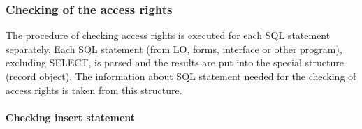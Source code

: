 \subsubsection{Checking of the access rights}

The procedure of checking access rights is executed for each SQL statement separately. Each SQL statement (from LO, forms, interface or 
other program), excluding SELECT, is parsed and the results are put into the special structure (record object). The information about SQL 
statement needed for the checking of access rights is taken from this structure.\\

\paragraph{\textbf{Checking insert statement}}

